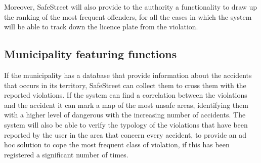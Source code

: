 \documentclass[../RASD.tex]{subfiles}
\begin{document}
    Moreover, SafeStreet will also provide to the authority a functionality to draw up the ranking of the most frequent offenders, for all the cases in which the system will be able to track down the licence plate from the violation.
    \subsection{Municipality featuring functions}\label{subsec:municipality-featuring-functions}
    If the municipality has a database that provide information about the accidents that occurs in its territory, SafeStreet can collect them to cross them with the reported violations. If the system can find a correlation between the violations and the accident it can mark a map of the most unsafe areas, identifying them with a higher level of dangerous with the increasing number of accidents. The system will also be able to verify the typology of the violations that have been reported by the user in the area that concern every accident, to provide an ad hoc solution to cope the most frequent class of violation, if this has been registered a significant number of times.
\end{document}

